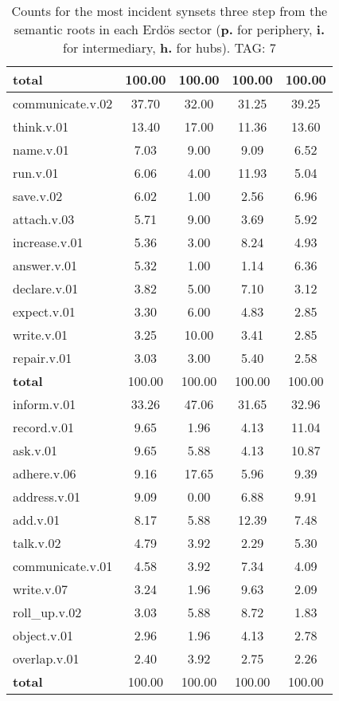 \begin{table}[h!]
\begin{center}
\begin{tabular}{| l || c | c | c | c |}
{{\bf total}} & 100.00  & 100.00  & 100.00  & 100.00 \\\hline\hline\hline
communicate.v.02 & 37.70  & 32.00  & 31.25  & 39.25 \\\hline
think.v.01 & 13.40  & 17.00  & 11.36  & 13.60 \\\hline
name.v.01 & 7.03  & 9.00  & 9.09  & 6.52 \\\hline
run.v.01 & 6.06  & 4.00  & 11.93  & 5.04 \\\hline
save.v.02 & 6.02  & 1.00  & 2.56  & 6.96 \\\hline
attach.v.03 & 5.71  & 9.00  & 3.69  & 5.92 \\\hline
increase.v.01 & 5.36  & 3.00  & 8.24  & 4.93 \\\hline
answer.v.01 & 5.32  & 1.00  & 1.14  & 6.36 \\\hline
declare.v.01 & 3.82  & 5.00  & 7.10  & 3.12 \\\hline
expect.v.01 & 3.30  & 6.00  & 4.83  & 2.85 \\\hline
write.v.01 & 3.25  & 10.00  & 3.41  & 2.85 \\\hline
repair.v.01 & 3.03  & 3.00  & 5.40  & 2.58 \\\hline\hline
{{\bf total}} & 100.00  & 100.00  & 100.00  & 100.00 \\\hline\hline\hline
inform.v.01 & 33.26  & 47.06  & 31.65  & 32.96 \\\hline
record.v.01 & 9.65  & 1.96  & 4.13  & 11.04 \\\hline
ask.v.01 & 9.65  & 5.88  & 4.13  & 10.87 \\\hline
adhere.v.06 & 9.16  & 17.65  & 5.96  & 9.39 \\\hline
address.v.01 & 9.09  & 0.00  & 6.88  & 9.91 \\\hline
add.v.01 & 8.17  & 5.88  & 12.39  & 7.48 \\\hline
talk.v.02 & 4.79  & 3.92  & 2.29  & 5.30 \\\hline
communicate.v.01 & 4.58  & 3.92  & 7.34  & 4.09 \\\hline
write.v.07 & 3.24  & 1.96  & 9.63  & 2.09 \\\hline
roll\_up.v.02 & 3.03  & 5.88  & 8.72  & 1.83 \\\hline
object.v.01 & 2.96  & 1.96  & 4.13  & 2.78 \\\hline
overlap.v.01 & 2.40  & 3.92  & 2.75  & 2.26 \\\hline\hline
{{\bf total}} & 100.00  & 100.00  & 100.00  & 100.00 \\\hline
\end{tabular}
\caption{Counts for the most incident synsets three step from the semantic roots in each Erd\"os sector ({\bf p.} for periphery, {\bf i.} for intermediary, {\bf h.} for hubs). TAG: 7}
\end{center}
\end{table}